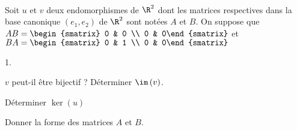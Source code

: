 \documentclass[11pt]{article}%
\begin{document}
\begin{exerciceSP}~\\
  Soit $u$ et $v$ deux endomorphismes de $\R^{2}$ dont les matrices
  respectives dans la base canonique $\left( e_{1},e_{2}\right) $ de
  $\R^{2}$ sont notées $A$ et $B$. On suppose que $AB=%
  \begin{smatrix}
    0 & 0 \\ 
    0 & 0%
  \end{smatrix}%
  $ et $BA=%
  \begin{smatrix}
    0 & 1 \\ 
    0 & 0%
  \end{smatrix}%
  $

  \begin{noliste}{1.}
    \setlength{\itemsep}{2mm}
  \item $v$ peut-il être bijectif ? Déterminer $\im \left( v\right) $.

  \item Déterminer $\ker \left( u\right) $

  \item Donner la forme des matrices $A$ et $B$.
  \end{noliste}
\end{exerciceSP}


\end{document}
